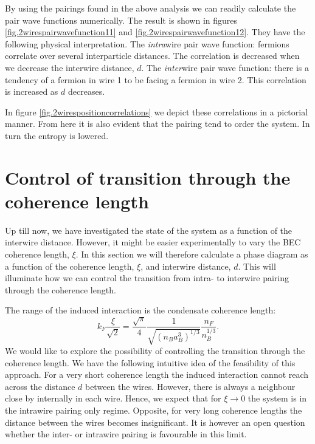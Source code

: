 By using the pairings found in the above analysis we can readily calculate the pair wave functions numerically. The result is shown in figures \ref{fig.2wirespairwavefunction11} and \ref{fig.2wirespairwavefunction12}. They have the following physical interpretation. The \textit{intra}wire pair wave function: fermions correlate over several interparticle distances. The correlation is decreased when we decrease the interwire distance, $d$. The \textit{inter}wire pair wave function: there is a tendency of a fermion in wire 1 to be facing a fermion in wire 2. This correlation is increased as $d$ decreases. 

In figure \ref{fig.2wirespositioncorrelations} we depict these correlations in a pictorial manner. From here it is also evident that the pairing tend to order the system. In turn the entropy is lowered. 


\section{Control of transition through the coherence length}
\label{sec.2wires_crossover_control_coherence_length}
Up till now, we have investigated the state of the system as a function of the interwire distance. However, it might be easier experimentally to vary the BEC coherence length, $\xi$. In this section we will therefore calculate a phase diagram as a function of the coherence length, $\xi$, and interwire distance, $d$. This will illuminate how we can control the transition from intra- to interwire pairing through the coherence length. 

The range of the induced interaction is the condensate coherence length:
\begin{equation}
k_F\frac{\xi}{\sqrt{2}} = \frac{\sqrt{\pi}}{4}\frac{1}{\sqrt{(n_Ba_B^3)^{1/3}}}\frac{n_F}{n_B^{1/3}}.
\label{eq.RangefunctionofrBBnB}
\end{equation}
We would like to explore the possibility of controlling the transition through the coherence length. We have the following intuitive idea of the feasibility of this approach. For a very short coherence length the induced interaction cannot reach across the distance $d$ between the wires. However, there is always a neighbour close by internally in each wire. Hence, we expect that for $\xi \to 0$ the system is in the intrawire pairing only regime. Opposite, for very long coherence lengths the distance between the wires becomes insignificant. It is however an open question whether the inter- or intrawire pairing is favourable in this limit. 

